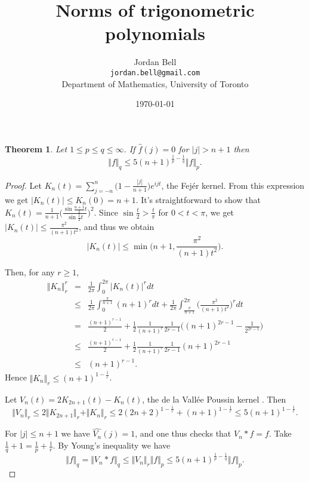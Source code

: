 \documentclass{article}
\newcommand{\norm}[1]{\Vert #1 \Vert}
\newtheorem{theorem}{Theorem}
\begin{document}
\title{Norms of trigonometric polynomials}
\author{Jordan Bell\\ \texttt{jordan.bell@gmail.com}\\Department of Mathematics, University of Toronto}
\date{\today}

\maketitle

\begin{theorem}
Let $1 \leq p \leq q \leq \infty$.
If $\hat{f}(j)=0$ for $|j|>n+1$ then
\[
\norm{f}_q \leq 5(n+1)^{\frac{1}{p}-\frac{1}{q}} \norm{f}_p.
\]
\end{theorem}
\begin{proof}
Let $K_n(t)=\sum_{j=-n}^n \Big(1-\frac{|j|}{n+1}\Big)e^{ijt}$, the Fej\'er kernel.
From this expression we get $|K_n(t)| \leq K_n(0)= n+1$.
 It's straightforward to show
that $K_n(t)=\frac{1}{n+1}\Big(\frac{\sin \frac{n+1}{2}t}{\sin \frac{1}{2}t} \Big)^2$.
Since $\sin \frac{t}{2}>\frac{t}{\pi}$ for $0 < t < \pi$, we get $|K_n(t)| \leq   \frac{\pi^2}{(n+1)t^2}$, and
thus we obtain
\[
|K_n(t)| \leq \min\Big(n+1, \frac{\pi^2}{(n+1)t^2} \Big).
\]

Then, for any $r \geq 1$,
\begin{eqnarray*}
\norm{K_n}_r^r&=&\frac{1}{2\pi} \int_0^{2\pi} |K_n(t)|^r dt\\
&\leq&\frac{1}{2\pi} \int_0^{\frac{\pi}{n+1}} (n+1)^r dt
+\frac{1}{2\pi} \int_{\frac{\pi}{n+1}}^{2\pi} \Big(\frac{\pi^2}{(n+1)t^2}\Big)^r dt\\
&=&\frac{(n+1)^{r-1}}{2} 
+\frac{1}{2}\frac{1}{(n+1)^r}\frac{1}{2r-1}\Big( (n+1)^{2r-1}-\frac{1}{2^{2r-1}}\Big)\\
&\leq&\frac{(n+1)^{r-1}}{2} 
+\frac{1}{2}\frac{1}{(n+1)^r}\frac{1}{2r-1}(n+1)^{2r-1}\\
&\leq&(n+1)^{r-1}.
\end{eqnarray*}
Hence $\norm{K_n}_r \leq (n+1)^{1-\frac{1}{r}}$.

Let $V_n(t)=2K_{2n+1}(t)-K_n(t)$, the de la Vall\'ee Poussin kernel
\cite[p. 16]{katznelson}.
Then
\[
\norm{V_n}_r \leq 2\norm{K_{2n+1}}_r+\norm{K_n}_r \leq 2(2n+2)^{1-\frac{1}{r}}+(n+1)^{1-\frac{1}{r}}
\leq 5(n+1)^{1-\frac{1}{r}}.
\]

For $|j| \leq n+1$ we have $\widehat{V_n}(j)=1$, and one thus checks that $V_n * f=f$. Take $\frac{1}{q}+1=\frac{1}{p}+\frac{1}{r}$.
By
Young's inequality we have 
\[
\norm{f}_q=\norm{V_n * f}_q \leq \norm{V_n}_r \norm{f}_p
\leq 5(n+1)^{\frac{1}{p}-\frac{1}{q}} \norm{f}_p.
\]
\end{proof}



\end{document}
